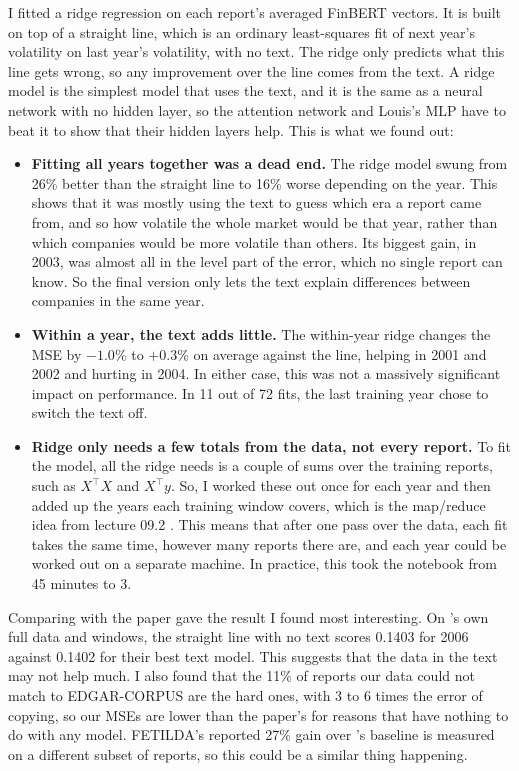 \documentclass[11pt,a4paper]{article}
\begin{document}
I fitted a ridge regression on each report's averaged FinBERT vectors. It is built on top of a straight line, which
is an ordinary least-squares fit of next year's volatility on last year's volatility, with no text. The ridge only
predicts what this line gets wrong, so any improvement over the line comes from the text. A ridge model is the
simplest model that uses the text, and it is the same as a neural network with no hidden layer, so the attention
network and Louis's MLP have to beat it to show that their hidden layers help. This is what we found out:

\begin{itemize}
  \item \textbf{Fitting all years together was a dead end.} The ridge model swung from 26\% better than the straight
    line to 16\% worse depending on the year. This shows that it was mostly using the text to guess which era a report
    came from, and so how volatile the whole market would be that year, rather than which companies would be more
    volatile than others. Its biggest gain, in 2003, was almost all in the level part of the error, which no single
    report can know. So the final version only lets the text explain differences between companies in the same year.
  \item \textbf{Within a year, the text adds little.} The within-year ridge changes the MSE by $-1.0\%$ to $+0.3\%$ on
    average against the line, helping in 2001 and 2002 and hurting in 2004. In either case, this was not a massively
    significant impact on performance. In 11 out of 72 fits, the last training year chose to switch the text off.
  \item \textbf{Ridge only needs a few totals from the data, not every report.} To fit the model, all the ridge needs
    is a couple of sums over the training reports, such as $X^\top X$ and $X^\top y$. So, I worked these out once for
    each year and then added up the years each training window covers, which is the map/reduce idea from lecture 09.2
    \citep{dst092}. This means that after one pass over the data, each fit takes the same time, however many reports
    there are, and each year could be worked out on a separate machine. In practice, this took the notebook from 45
    minutes to 3.
\end{itemize}

Comparing with the paper gave the result I found most interesting. On \citeauthor{kogan2009}'s own full data and
windows, the straight line with no text scores 0.1403 for 2006 against 0.1402 for their best text model. This
suggests that the data in the text may not help much. I also found that the 11\% of reports our data could not match
to EDGAR-CORPUS \citep{loukas2021} are the hard ones, with 3 to 6 times the error of copying, so our MSEs are lower
than the paper's for reasons that have nothing to do with any model. FETILDA's \citep{xia2022} reported 27\% gain over
\citeauthor{kogan2009}'s baseline is measured on a different subset of reports, so this could be a similar thing
happening.
\end{document}
